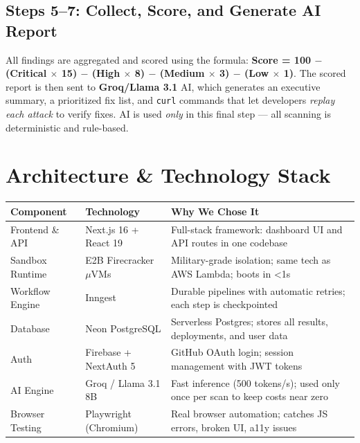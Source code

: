 \documentclass[11pt, a4paper]{article}
\begin{document}
\subsection{Steps 5--7: Collect, Score, and Generate AI Report}
All findings are aggregated and scored using the formula: \textbf{Score = 100 $-$ (Critical $\times$ 15) $-$ (High $\times$ 8) $-$ (Medium $\times$ 3) $-$ (Low $\times$ 1)}. The scored report is then sent to \textbf{Groq/Llama 3.1} AI, which generates an executive summary, a prioritized fix list, and \texttt{curl} commands that let developers \textit{replay each attack} to verify fixes. AI is used \textit{only} in this final step --- all scanning is deterministic and rule-based.

\newpage


\section{Architecture \& Technology Stack}

\begin{center}
\renewcommand{\arraystretch}{1.3}
\small
\begin{tabularx}{\textwidth}{@{}l l X@{}}
\toprule
\textbf{Component} & \textbf{Technology} & \textbf{Why We Chose It} \\
\midrule
Frontend \& API  & Next.js 16 + React 19 & Full-stack framework: dashboard UI and API routes in one codebase \\
Sandbox Runtime  & E2B Firecracker $\mu$VMs & Military-grade isolation; same tech as AWS Lambda; boots in <1s \\
Workflow Engine  & Inngest & Durable pipelines with automatic retries; each step is checkpointed \\
Database         & Neon PostgreSQL & Serverless Postgres; stores all results, deployments, and user data \\
Auth             & Firebase + NextAuth 5 & GitHub OAuth login; session management with JWT tokens \\
AI Engine        & Groq / Llama 3.1 8B & Fast inference (500 tokens/s); used only once per scan to keep costs near zero \\
Browser Testing  & Playwright (Chromium) & Real browser automation; catches JS errors, broken UI, a11y issues \\
\bottomrule
\end{tabularx}
\end{center}
\end{document}
